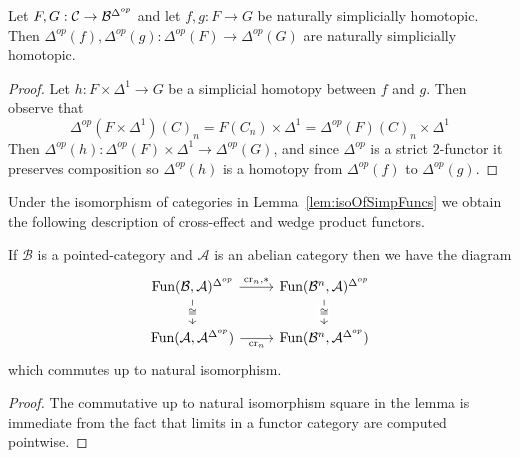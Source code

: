 \begin{lem}[label=lem:Precomp]
    Let $F,G: \mathcal{C}\rightarrow \mathcal{B}^{\Delta^{op}}$ and let $f,g:F\to G$ be naturally simplicially homotopic. Then $\Delta^{op}(f),\Delta^{op}(g):\Delta^{op}(F)\to\Delta^{op}(G)$ are naturally simplicially homotopic.
\end{lem}
\begin{proof}
    Let $h:F\times \Delta^1\to G$ be a simplicial homotopy between $f$ and $g$. Then observe that 
    \begin{equation*}
        \Delta^{op}(F\times \Delta^1)(C)_n = F(C_n)\times \Delta^1 = \Delta^{op}(F)(C)_n\times \Delta^1
    \end{equation*}
    Then $\Delta^{op}(h):\Delta^{op}(F)\times \Delta^1\to \Delta^{op}(G)$, and since $\Delta^{op}$ is a strict 2-functor it preserves composition so $\Delta^{op}(h)$ is a homotopy from $\Delta^{op}(f)$ to $\Delta^{op}(g)$.
\end{proof}


Under the isomorphism of categories in Lemma~\ref{lem:isoOfSimpFuncs} we obtain the following description of cross-effect and wedge product functors.


\begin{lem}[label=lem:deltaCrossEffect]
    If $\mathcal{B}$ is a pointed-category and $\mathcal{A}$ is an abelian category then we have the diagram
    \[\begin{tikzcd}
        {\text{Fun}(\mathcal{B},\mathcal{A})\Sob} & {\text{Fun}(\mathcal{B}^n,\mathcal{A})\Sob} \\
        {\text{Fun}(\mathcal{A},\mathcal{A}\Sob)} & {\text{Fun}(\mathcal{B}^n,\mathcal{A}\Sob)}
        \arrow["{\text{cr}_{n},*}", from=1-1, to=1-2]
        \arrow["\cong"{description}, from=1-1, to=2-1]
        \arrow["\cong"{description}, from=1-2, to=2-2]
        \arrow["{\text{cr}_n}"', from=2-1, to=2-2]
    \end{tikzcd}\]
    which commutes up to natural isomorphism.
\end{lem}
\begin{proof}
    The commutative up to natural isomorphism square in the lemma is immediate from the fact that limits in a functor category are computed pointwise.
\end{proof}

